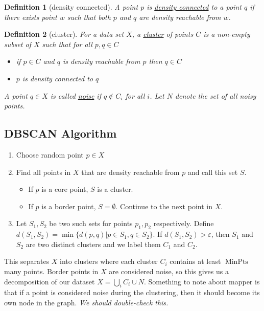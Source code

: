 \documentclass{article}
\def\minpts{\operatorname{MinPts}}
\newtheorem{definition}{Definition}[section]
\newcommand{\comment}[1]{{\color{violet} \it #1}}
\begin{document}
\begin{definition}[density connected]
    A point $p$ is \underline{density connected} to a point $q$ if there exists point $w$ such that both $p$ and $q$ are density reachable from $w$.
\end{definition}
\begin{definition}[cluster]
    For a data set $X$, a \underline{cluster} of points $C$ is a non-empty subset of $X$ such that for all $p,q\in C$
    \begin{itemize}
        \item[(Maximality) $\circ$] if $p\in C$ and $q$ is density reachable from $p$ then $q\in C$
        \item[(Connected) $\circ$] $p$ is density connected to $q$
    \end{itemize}
    A point $q\in X$ is called \underline{noise} if $q\notin C_i$ for all $i$. Let $N$ denote the set of all noisy points.
\end{definition}

\subsection{DBSCAN Algorithm}

\begin{enumerate}
    \item Choose random point $p\in X$
    \item Find all points in $X$ that are density reachable from $p$ and call this set $S$.
    \begin{itemize}
        \item If $p$ is a core point, $S$ is a cluster.
        \item If $p$ is a border point, $S=\emptyset$. Continue to the next point in $X$.
    \end{itemize}
    \item Let $S_1,S_2$ be two such sets for points $p_1,p_2$ respectively. Define $d(S_1,S_2)=\min\{d(p,q) | p\in S_1, q\in S_2\}$. If $d(S_1,S_2)>\varepsilon$, then $S_1$ and $S_2$ are two distinct clusters and we label them $C_1$ and $C_2$.
\end{enumerate}
This separates $X$ into clusters where each cluster $C_i$ contains at least $\minpts$ many points. Border points in $X$ are considered noise, so this gives us a decomposition of our dataset $X=\bigcup_i C_i \cup N$. 
Something to note about mapper is that if a point is considered noise during the clustering, then it should become its own node in the graph. \comment{We should double-check this.}
\end{document}
